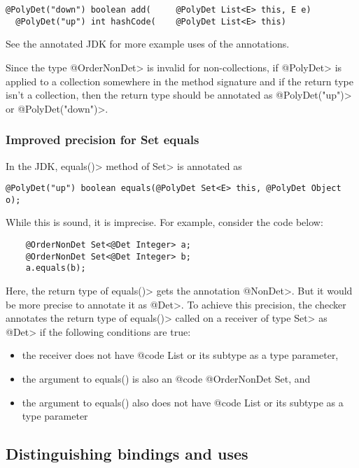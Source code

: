 \begin{Verbatim}
@PolyDet("down") boolean add(     @PolyDet List<E> this, E e)
  @PolyDet("up") int hashCode(    @PolyDet List<E> this)
\end{Verbatim}

See the annotated JDK for more example uses of the annotations.

Since the type \<@OrderNonDet> is invalid for non-collections,
if \<@PolyDet> is applied to a collection somewhere in the method signature
and if the return type isn't a collection, then the return type should be
annotated as \<@PolyDet("up")> or \<@PolyDet("down")>.

\subsubsection{Improved precision for Set equals\label{improved-precision-set-equals}}

In the JDK, \<equals()> method of \<Set> is annotated as
\begin{Verbatim}
@PolyDet("up") boolean equals(@PolyDet Set<E> this, @PolyDet Object o);
\end{Verbatim}
While this is sound, it is imprecise.
For example, consider the code below:

\begin{Verbatim}
    @OrderNonDet Set<@Det Integer> a;
    @OrderNonDet Set<@Det Integer> b;
    a.equals(b);
\end{Verbatim}

Here, the return type of \<equals()> gets the annotation \<@NonDet>.
But it would be more precise to annotate it as \<@Det>.
To achieve this precision, the checker annotates the return type
of \<equals()> called on a receiver of type \<Set> as \<@Det> if the
following conditions are true:
\begin{itemize}
    \item the receiver does not have {@code List} or its subtype as a type parameter,
    \item the argument to equals() is also an {@code @OrderNonDet Set}, and
    \item the argument to equals() also does not have {@code List} or its subtype as a
    type parameter
\end{itemize}

\subsection{Distinguishing bindings and uses\label{determinism-polymorphism-binding}}

